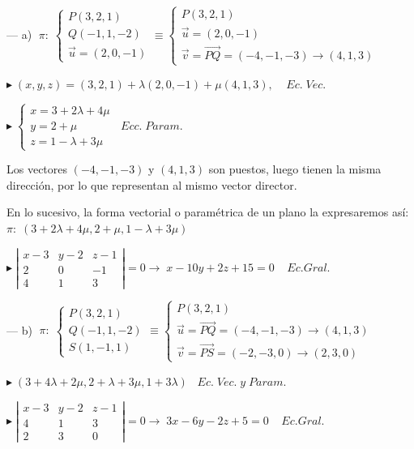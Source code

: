 \begin{proofw}\renewcommand{\qedsymbol}{$\diamond$}
	
	--- a) $\; \pi:\; \begin{cases} P(3,2,1) \\ Q(-1,1,-2) \\ \vec u=(2,0,-1) \end{cases} \equiv \begin{cases} P(3,2,1)  \\ \vec u=(2,0,-1) \\ \vec v=\overrightarrow{PQ}=(-4,-1,-3)\to (4,1,3) \end{cases}$
	
\noindent $\blacktriangleright\; (x,y,z)=(3,2,1)+\lambda (2,0,-1)+\mu (4,1,3), \; \;\;\; Ec.\; Vec.$

\noindent $\blacktriangleright \; \begin{cases} x=3+2\lambda + 4 \mu \\ y=2+\mu \\ z= 1-\lambda
+3\mu \end{cases} \;\;Ecc.\; Param.$

\noindent \textcolor{gris}{Los vectores $(-4,-1,-3)$ y $(4,1,3)$ son puestos, luego tienen la misma dirección, por lo que representan al mismo vector director.}

\noindent \textcolor{gris}{En lo sucesivo, la forma vectorial o paramétrica de un plano la expresaremos así: $\pi:\; (3+2\lambda + 4 \mu , 2+\mu ,1-\lambda
+3\mu )$}


\noindent $\blacktriangleright \; \left| \begin{matrix} x-3&y-2&z-1 \\ 2&0&-1 \\ 4&1&3 \end{matrix} \right|=0 \to \; x-10y+2z+15=0\;\;\;\; Ec. Gral.$

\noindent --- b)  $\; \pi:\; \begin{cases} P(3,2,1) \\ Q(-1,1,-2) \\ S(1,-1,1) \end{cases} \equiv \begin{cases} P(3,2,1)  \\ \vec u=\overrightarrow{PQ}=(-4,-1,-3)\to (4,1,3)  \\ \vec v=\overrightarrow{PS}=(-2,-3,0)\to (2,3,0) \end{cases}$

\noindent $\blacktriangleright\; (3+4\lambda+2\mu, 2+\lambda +3 \mu , 1+3\lambda )\;\;\; Ec.\; Vec.\;y\;Param.$

\noindent $\blacktriangleright\; \left| \begin{matrix} x-3&y-2&z-1 \\ 4&1&3 \\ 2&3&0 \end{matrix} \right|=0 \to \; 3x-6y-2z+5=0\;\;\;\; Ec. Gral.$

\end{proofw}


